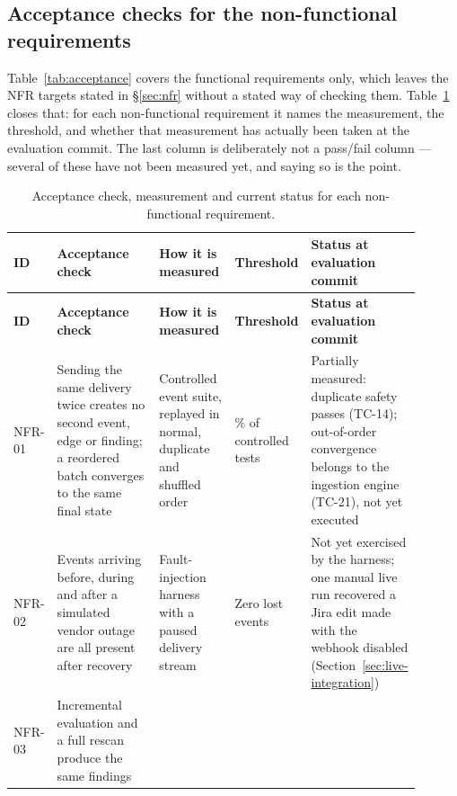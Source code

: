 \subsection{Acceptance checks for the non-functional requirements}
\label{sec:acceptance-nfr}

Table~\ref{tab:acceptance} covers the functional requirements only, which
leaves the NFR targets stated in \S\ref{sec:nfr} without a stated way of
checking them. Table~\ref{tab:acceptance-nfr} closes that: for each
non-functional requirement it names the measurement, the threshold, and
whether that measurement has actually been taken at the evaluation commit.
The last column is deliberately not a pass/fail column --- several of these
have not been measured yet, and saying so is the point.

\begin{longtable}{>{\raggedright\arraybackslash}p{0.09\linewidth} >{\raggedright\arraybackslash}p{0.34\linewidth} >{\raggedright\arraybackslash}p{0.20\linewidth}
                  >{\raggedright\arraybackslash}p{0.13\linewidth} >{\raggedright\arraybackslash}p{0.14\linewidth}}
\caption{Acceptance check, measurement and current status for each
         non-functional requirement.}\label{tab:acceptance-nfr}\\
\hline
\textbf{ID} & \textbf{Acceptance check} & \textbf{How it is measured} &
  \textbf{Threshold} & \textbf{Status at evaluation commit} \\
\hline
\endfirsthead
\hline
\textbf{ID} & \textbf{Acceptance check} & \textbf{How it is measured} &
  \textbf{Threshold} & \textbf{Status at evaluation commit} \\
\hline
\endhead
NFR-01 & Sending the same delivery twice creates no second event, edge or
  finding; a reordered batch converges to the same final state & Controlled
  event suite, replayed in normal, duplicate and shuffled order &
  100\% of controlled tests & Partially measured: duplicate safety passes
  (TC-14); out-of-order convergence belongs to the ingestion engine (TC-21),
  not yet executed \\
NFR-02 & Events arriving before, during and after a simulated vendor outage
  are all present after recovery & Fault-injection harness with a paused
  delivery stream & Zero lost events & Not yet exercised by the harness; one
  manual live run recovered a Jira edit made with the webhook disabled
  (Section~\ref{sec:live-integration}) \\
NFR-03 & Incremental evaluation and a full rescan produce the same findings &

\end{longtable}
